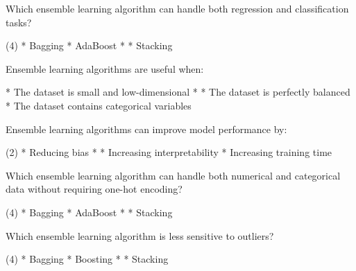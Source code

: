 \documentclass[11pt]{extarticle}
\begin{document}
\begin{exercise}
    Which ensemble learning algorithm can handle both regression and classification tasks?
    \begin{choice} (4)
        * Bagging
        * AdaBoost
        * 
        * Stacking
    \end{choice}
\end{exercise}
\begin{solution}
\end{solution}

\begin{exercise}
    Ensemble learning algorithms are useful when:
    \begin{choice}
        * The dataset is small and low-dimensional
        * 
        * The dataset is perfectly balanced
        * The dataset contains categorical variables
    \end{choice}
\end{exercise}
\begin{solution}
\end{solution}

\begin{exercise}
    Ensemble learning algorithms can improve model performance by:
    \begin{choice} (2)
        * Reducing bias
        * 
        * Increasing interpretability
        * Increasing training time
    \end{choice}
\end{exercise}
\begin{solution}
\end{solution}

\begin{exercise}
    Which ensemble learning algorithm can handle both numerical and categorical data without requiring one-hot encoding?
    \begin{choice} (4)
        * Bagging
        * AdaBoost
        * 
        * Stacking
    \end{choice}
\end{exercise}
\begin{solution}
\end{solution}

\begin{exercise}
    Which ensemble learning algorithm is less sensitive to outliers?
    \begin{choice} (4)
        * Bagging
        * Boosting
        * 
        * Stacking
    \end{choice}
\end{exercise}
\begin{solution}
\end{solution}
\end{document}
